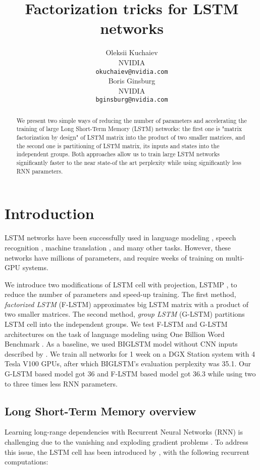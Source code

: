 \documentclass{article} \usepackage{iclr2017_workshop,times}
\title{Factorization tricks for LSTM networks}
\author{Oleksii Kuchaiev \\
NVIDIA \\
\texttt{okuchaiev@nvidia.com} \\ 
\And
Boris Ginsburg \\
NVIDIA\\
\texttt{bginsburg@nvidia.com} \\
}
\begin{document}
\maketitle

\begin{abstract}
We present two simple ways of reducing the number of parameters and accelerating the training of large Long Short-Term Memory (LSTM) networks: the first one is "matrix factorization by design" of LSTM matrix into the product of two smaller matrices, and the second one is partitioning of LSTM matrix, its inputs and states into the independent groups. Both approaches allow us to train large LSTM networks significantly faster to the near state-of the art perplexity while using significantly less RNN parameters.
\end{abstract}

\section{Introduction}
LSTM networks  \citep{hochreiter1997long} have been successfully used in language modeling  \citep{jozefowicz2016exploring,shazeer2017outrageously}, speech recognition \citep{xiong2016achieving}, machine translation \citep{wu2016google}, and many other tasks. However, these networks have millions of parameters, and require weeks of training on multi-GPU systems.

We introduce two modifications of LSTM cell with projection, LSTMP \citep{sak2014long}, to reduce the number of parameters and speed-up training. The first method, \textit{factorized LSTM} (F-LSTM) approximates big LSTM matrix with a product of two smaller matrices. The second method, \textit{group LSTM} (G-LSTM) partitions LSTM cell into the independent groups. We test  F-LSTM and G-LSTM architectures on the task of language modeling using One Billion Word Benchmark \citep{chelba2013one}. As a baseline, we used BIGLSTM model without CNN inputs described by \citet{jozefowicz2016exploring}. We train all networks for 1 week on a DGX Station system with 4 Tesla V100 GPUs, after which BIGLSTM's evaluation perplexity was 35.1. Our G-LSTM based model got 36 and F-LSTM based model got 36.3 while using two to three times less RNN parameters.


\subsection{Long Short-Term Memory overview}
Learning long-range dependencies with Recurrent Neural Networks (RNN) is challenging due to the vanishing and exploding gradient problems \citep{bengio1994learning, pascanu2013difficulty}. To address this issue, the  LSTM cell has been introduced by  \citet{hochreiter1997long}, with the following recurrent computations:  
\end{document}

